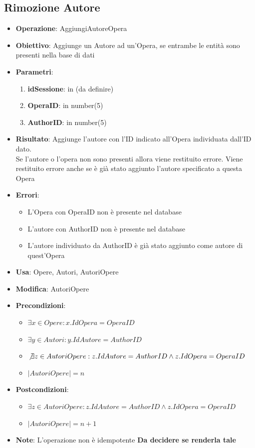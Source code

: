 \documentclass[a4paper,11pt]{article}
\begin{document}
\subsection{Rimozione Autore}
\begin{itemize}
	\item \textbf{Operazione}: AggiungiAutoreOpera
	\item \textbf{Obiettivo}: Aggiunge un Autore ad un'Opera, se entrambe le entità sono presenti nella base di dati
	\item \textbf{Parametri}:
	\begin{enumerate}
		\item \textbf{idSessione}: in (da definire)
		\item \textbf{OperaID}: in number(5)
		\item \textbf{AuthorID}: in number(5)
	\end{enumerate}
	\item \textbf{Risultato}: Aggiunge l'autore con l'ID indicato all'Opera individuata dall'ID dato.\\
	Se l'autore o l'opera non sono presenti allora viene restituito errore.	Viene restituito errore anche se è già stato aggiunto l'autore specificato a questa Opera
	\item \textbf{Errori}: 
	\begin{itemize}
		\item L'Opera con OperaID non è presente nel database
		\item L'autore con AuthorID non è presente nel database
		\item L'autore individuato da AuthorID è già stato aggiunto come autore di quest'Opera
	\end{itemize}
	\item \textbf{Usa}: Opere, Autori, AutoriOpere
	\item \textbf{Modifica}: AutoriOpere
	\item \textbf{Precondizioni}:
	\begin{itemize}
		\item $\exists x \in Opere : x.IdOpera = OperaID$
		\item $\exists y \in Autori : y.IdAutore = AuthorID$
		\item $\not\exists z \in AutoriOpere : z.IdAutore = AuthorID \land z.IdOpera = OperaID$
		\item $|AutoriOpere| = n$
	\end{itemize}
	\item \textbf{Postcondizioni}:
	\begin{itemize}
		\item $\exists z \in AutoriOpere : z.IdAutore = AuthorID \land z.IdOpera = OperaID$
		\item $|AutoriOpere| = n + 1$
	\end{itemize}
	\item \textbf{Note}: L'operazione non è idempotente \textbf{\color{red} Da decidere se renderla tale}
\end{itemize}
\end{document}
